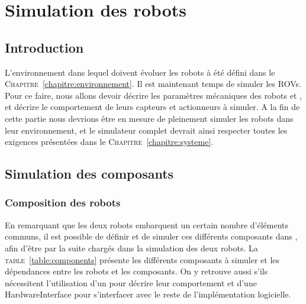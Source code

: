 \chapter{Simulation des robots}
\label{chapitre:robots}
	
	\section{Introduction}

		L'environnement dans lequel doivent évoluer les robots à été défini dans le \textsc{Chapitre}~\ref{chapitre:environnement}. Il est maintenant temps de simuler les \gls{ROV}s. Pour ce faire, nous allons devoir décrire les paramètres mécaniques des robots \argos{} et \atoll{}, et décrire le comportement de leurs capteurs et actionneurs à simuler. A la fin de cette partie nous devrions être en mesure de pleinement simuler les robots dans leur environnement, et le simulateur complet devrait ainsi respecter toutes les exigences présentées dans le \textsc{Chapitre}~\ref{chapitre:systeme}.

	\section{Simulation des composants}

		\subsection{Composition des robots}
			En remarquant que les deux robots embarquent un certain nombre d'éléments communs, il est possible de définir et de simuler ces différents composants dans \gazebo, afin d'être par la suite chargés dans la simulation des deux robots. La \textsc{table}~\ref{table:components} présente les différents composants à simuler et les dépendances entre les robots et les composants. On y retrouve aussi s'ils nécessitent l'utilisation d'un \plugin{} \gazebo{} pour décrire leur comportement et d'une \gls{HardwareInterface} pour s'interfacer avec le reste de l'implémentation logicielle.

